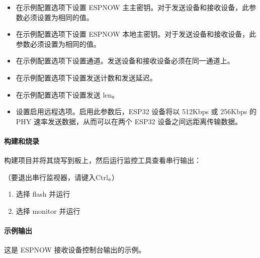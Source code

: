 \documentclass[a4paper,12pt,english]{sphinxmanual}
\begin{document}
{{\begin{itemize}
\item {} 
\sphinxAtStartPar
在示例配置选项下设置 ESPNOW 主主密钥。对于发送设备和接收设备，此参数必须设置为相同的值。

\item {} 
\sphinxAtStartPar
在示例配置选项下设置 ESPNOW 本地主密钥。对于发送设备和接收设备，此参数必须设置为相同的值。

\item {} 
\sphinxAtStartPar
在示例配置选项下设置通道。发送设备和接收设备必须在同一通道上。

\item {} 
\sphinxAtStartPar
在示例配置选项下设置发送计数和发送延迟。

\item {} 
\sphinxAtStartPar
在示例配置选项下设置发送 len。

\item {} 
\sphinxAtStartPar
设置启用远程选项。启用此参数后，ESP32 设备将以 512Kbps 或 256Kbps 的 PHY 速率发送数据，从而可以在两个 ESP32 设备之间远距离传输数据。

\end{itemize}


\paragraph{构建和烧录}
\label{\detokenize{exp-esp32/wifi/esp-now:id10}}
\sphinxAtStartPar
构建项目并将其烧写到板上，然后运行监控工具查看串行输出：

\sphinxAtStartPar
{}

\sphinxAtStartPar
{} （要退出串行监视器，请键入Ctrl\sphinxhyphen{}{]}。）

\sphinxAtStartPar
{}
\begin{enumerate}
%
\item {} 
\sphinxAtStartPar
选择 flash 并运行

\item {} 
\sphinxAtStartPar
选择 monitor 并运行

\end{enumerate}


\paragraph{示例输出}
\label{\detokenize{exp-esp32/wifi/esp-now:id11}}
\sphinxAtStartPar
这是 ESP\sphinxhyphen{}NOW 接收设备控制台输出的示例。

}}
\end{document}
